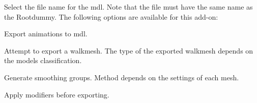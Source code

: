 Select the file name for the mdl. Note that the file must have the same name as the Rootdummy. 
The following options are available for this add-on: 

\begin{description}[leftmargin=12em,style=nextline]
    \item[Export Animations] Export animations to mdl.
    \item[Export Walkmesh] Attempt to export a walkmesh. The type of the exported walkmesh depends on the models classification.
    \item[Export Smooth Groups] Generate smoothing groups. Method depends on the settings of each mesh.
    \item[Apply Modifiers] Apply modifiers before exporting.
\end{description}
